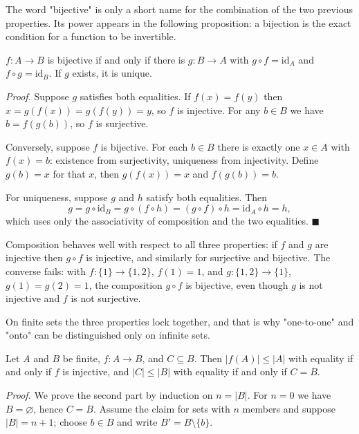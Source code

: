 The word "bijective" is only a short name for the combination of the two previous
properties. Its power appears in the following proposition: a bijection is the exact
condition for a function to be invertible.

\begin{proposisi}
$f : A \to B$ is bijective if and only if there is $g : B \to A$ with
$g \circ f = \mathrm{id}_A$ and $f \circ g = \mathrm{id}_B$. If $g$ exists, it is
unique.
\end{proposisi}
\par\smallskip\noindent\textit{Proof.} Suppose $g$ satisfies both equalities. If
$f(x) = f(y)$ then $x = g(f(x)) = g(f(y)) = y$, so $f$ is injective. For any
$b \in B$ we have $b = f(g(b))$, so $f$ is surjective.

Conversely, suppose $f$ is bijective. For each $b \in B$ there is exactly one
$x \in A$ with $f(x) = b$: existence from surjectivity, uniqueness from injectivity.
Define $g(b) = x$ for that $x$, then $g(f(x)) = x$ and $f(g(b)) = b$.

For uniqueness, suppose $g$ and $h$ satisfy both equalities. Then
\[
  g = g \circ \mathrm{id}_B = g \circ (f \circ h) = (g \circ f) \circ h
  = \mathrm{id}_A \circ h = h,
\]
which uses only the associativity of composition and the two equalities.
\hfill$\blacksquare${\parfillskip=0pt\par}

Composition behaves well with respect to all three properties: if $f$ and $g$ are
injective then $g \circ f$ is injective, and similarly for surjective and bijective.
The converse fails: with $f : \{1\} \to \{1,2\}$, $f(1) = 1$, and
$g : \{1,2\} \to \{1\}$, $g(1) = g(2) = 1$, the composition $g \circ f$ is bijective,
even though $g$ is not injective and $f$ is not surjective.

On finite sets the three properties lock together, and that is why "one-to-one" and
"onto" can be distinguished only on infinite sets.

\begin{lemma}
Let $A$ and $B$ be finite, $f : A \to B$, and $C \subseteq B$. Then
$|f(A)| \le |A|$ with equality if and only if $f$ is injective, and
$|C| \le |B|$ with equality if and only if $C = B$.
\end{lemma}
\par\smallskip\noindent\textit{Proof.} We prove the second part by induction on
$n = |B|$. For $n = 0$ we have $B = \varnothing$, hence $C = B$. Assume the claim for
sets with $n$ members and suppose $|B| = n+1$; choose $b \in B$ and write
$B' = B \setminus \{b\}$.

